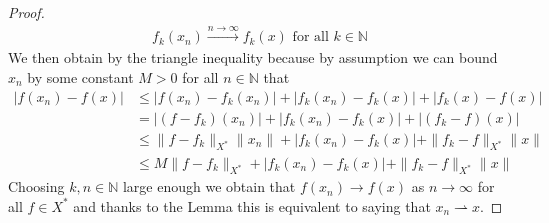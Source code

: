 \documentclass[12pt,a4paper]{article}
\newcommand{\wto}{\rightharpoonup}
\begin{document}
\begin{proof}
\begin{align*}
f_k(x_n) \overset{n \to \infty} \longrightarrow f_k(x) \text{ for all } k \in \mathbb{N}
\end{align*}
We then obtain by the triangle inequality because by assumption we can bound $x_n$ by some constant $M >0$ for all $n \in \mathbb{N}$ that 
\begin{align*}
|f(x_n)-f(x)| &\leq |f (x_n)-f_k(x_n)| + |f_k(x_n)-f_k(x)| + |f_k(x) - f(x)| \\
&= | (f-f_k)(x_n)| + |f_k(x_n)-f_k(x)| + |(f_k-f)(x)| \\
& \leq \| f-f_k\|_{X^*} \| x_n\| + |f_k(x_n) - f_k(x)| + \|f_k-f\|_{X^*} \|x\| \\
& \leq M\| f-f_k \|_{X^*}  + |f_k(x_n)-f_k(x)| + \|f_k-f\|_{X^*} \|x\| 
\end{align*}
Choosing $k,n \in \mathbb{N}$ large enough we obtain that $f(x_n) \to f(x)$ as $n \to \infty$ for all $f \in X^*$ and thanks to the Lemma this is equivalent to saying that $x_n \wto x$. 
\end{proof}
\end{document}
